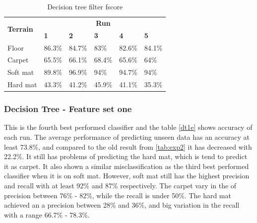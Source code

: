 \documentclass[USenglish]{ifimaster}  %
\begin{document}
	\begin{table}[h]
		\centering
		\begin{tabular}{@{}llllll@{}}
			\toprule
			\multirow{2}{*}{\textbf{Terrain}} & \multicolumn{5}{c}{\textbf{Run}} \\ \cmidrule(l){2-6} 
			& \multicolumn{1}{l|}{\textbf{1}} & \multicolumn{1}{l|}{\textbf{2}} & \multicolumn{1}{l|}{\textbf{3}} & \multicolumn{1}{l|}{\textbf{4}} & \textbf{5} \\ \midrule
			\multicolumn{1}{l|}{Floor} & \multicolumn{1}{l|}{86.3\%} & \multicolumn{1}{l|}{84.7\%} & \multicolumn{1}{l|}{83\%} & \multicolumn{1}{l|}{82.6\%} & 84.1\% \\ \midrule
			\multicolumn{1}{l|}{Carpet} & \multicolumn{1}{l|}{65.5\%} & \multicolumn{1}{l|}{66.1\%} & \multicolumn{1}{l|}{68.4\%} & \multicolumn{1}{l|}{65.6\%} & 64\% \\ \midrule
			\multicolumn{1}{l|}{Soft mat} & \multicolumn{1}{l|}{89.8\%} & \multicolumn{1}{l|}{96.9\%} & \multicolumn{1}{l|}{94\%} & \multicolumn{1}{l|}{94.7\%} & 94\% \\ \midrule
			\multicolumn{1}{l|}{Hard mat} & \multicolumn{1}{l|}{43.3\%} & \multicolumn{1}{l|}{41.2\%} & \multicolumn{1}{l|}{45.9\%} & \multicolumn{1}{l|}{41.1\%} & 35.3\% \\ \bottomrule
		\end{tabular}
		\caption{Decision tree filter fscore}
		\label{dtfilterfscore}
	\end{table}
	\FloatBarrier
	\newpage

\subsubsection{Decision Tree - Feature set one}
This is the fourth best performed classifier and the table \ref{dt1e} shows accuracy of each run. The average performance of predicting unseen data has an accuracy at least 73.8\%, and compared to the old result from \ref{tab:exp2} it has decreased with 22.2\%. It still has problems of predicting the hard mat, which is tend to predict it as carpet. It also shown a similar misclassification as the third best performed classifier when it is on soft mat. However, soft mat still has the highest precision and recall with at least 92\% and 87\% respectively. The carpet vary in the of precision between 76\% - 82\%, while the recall is under 50\%. The hard mat achieved an a precision between 28\% and 36\%, and big variation in the recall with a range 66.7\% - 78.3\%.

	
	
\end{document}
